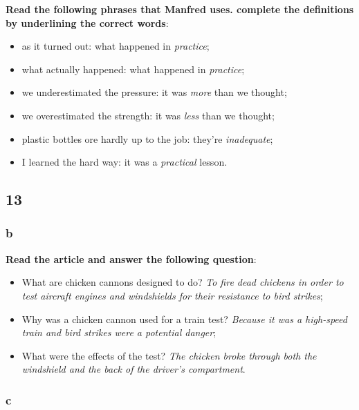 \textbf{Read the following phrases that Manfred uses. complete the definitions by underlining the correct words}:

\begin{itemize}

\item as it turned out: what happened in \textit{practice};
\item what actually happened: what happened in \textit{practice};
\item we underestimated the pressure: it was \textit{more} than we thought;
\item we overestimated the strength: it was \textit{less} than we thought;
\item plastic bottles ore hardly up to the job: they're \textit{inadequate};
\item I learned the hard way: it was a \textit{practical} lesson.

\end{itemize}

\subsection{13}

\subsubsection{b}

\textbf{Read the article and answer the following question}:

\begin{itemize}

\item What are chicken cannons designed to do? \textit{To fire dead chickens in order to test aircraft engines and windshields for their resistance to bird strikes};
\item Why was a chicken cannon used for a train test? \textit{Because it was a high-speed train and bird strikes were a potential danger};
\item What were the effects of the test? \textit{The chicken broke through both the windshield and the back of the driver's compartment}.

\end{itemize}

\subsubsection{c}

